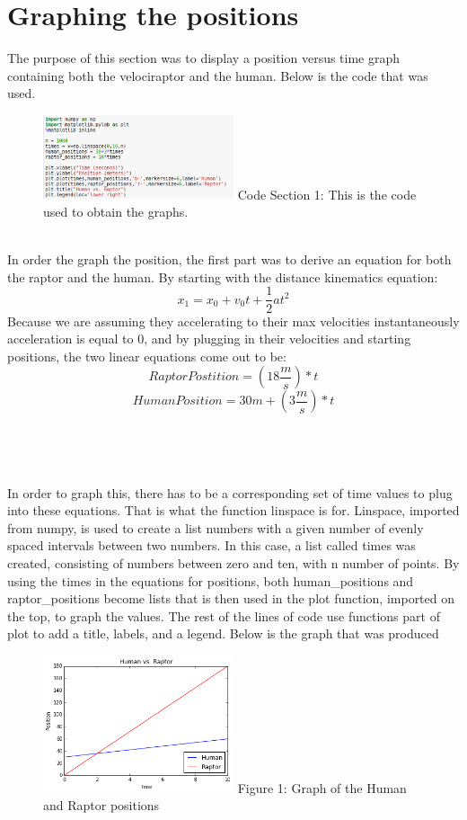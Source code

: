 \documentclass[twocolumn]{revtex4}
\begin{document}
\section{Graphing the positions}
	The purpose of this section was to display a position versus time graph
	containing both the velociraptor and the human. Below is the code that was used.\\
\begin{figure}[h!]
\includegraphics[width=0.5\textwidth]{Code1.png}
Code Section 1: This is the code used to obtain the graphs.
\end{figure}
	\\In order the graph the position, the first part was to derive an equation 
	for both the raptor and the human. By starting with the distance kinematics equation:
	$$x_1 = x_0 + v_0t + \frac{1}{2}at^2$$ 
	Because we are assuming they accelerating to their max velocities instantaneously
	acceleration is equal to 0, and by plugging in their velocities and starting positions, 
	the two linear equations come out to be:
	$$Raptor Postition = (18 \frac{m}{s})*t$$
	$$Human Position = 30m+(3 \frac{m}{s})*t$$
	\\
	\\
	\\
	\\In order to graph this, there has to be a corresponding set of time values
	to plug into these equations. That is what the function linspace is for. Linspace,
	imported from numpy, is used to create
	a list numbers with a given number of evenly spaced intervals between two numbers.
	In this case, a list called times was created, consisting of numbers between zero and
	ten, with n number of points. By using the times in the equations for positions, both
	human\_positions and raptor\_positions become lists that is then used in the plot function,
	imported on the top, to graph the values. The rest of the lines of code use functions part of
	plot to add a title, labels, and a legend. Below is the graph that was produced
\begin{figure}[h!]
\includegraphics[width=0.5\textwidth]{Figure1.png}
Figure 1: Graph of the Human and Raptor positions

\end{figure}
\end{document}
